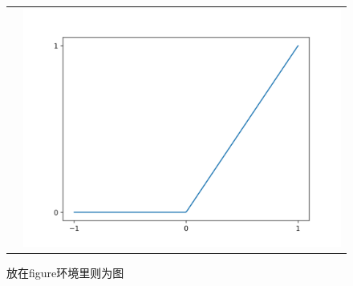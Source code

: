 \documentclass[UTF8,a4paper,8pt,no-math]{article} %
\numberwithin{equation}{section} %
\begin{document}
\begin{figure}[h]
\begin{tabular}{cc}
		 &
		\includegraphics[scale=0.2]{relu.png} \\
	\end{tabular}
	\caption{放在figure环境里则为图}
\end{figure}
\end{document}
